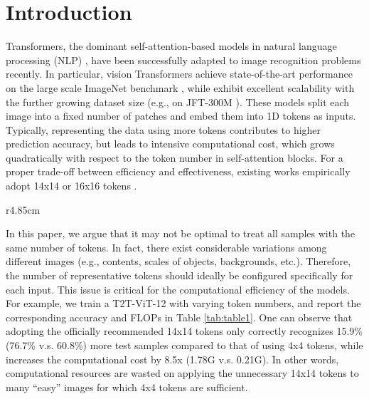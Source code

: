 \documentclass{article}
\begin{document}
\vspace{-1ex}
\section{Introduction}
\vspace{-1ex}
\label{sec:intro}

Transformers, the dominant self-attention-based models in natural language processing (NLP) \cite{devlin-etal-2019-bert, NIPS2017_3f5ee243, NEURIPS2020_1457c0d6}, have been successfully adapted to image recognition problems \cite{dosovitskiy2021an, yuan2021tokens, touvron2020training, han2021transformer} recently. In particular, vision Transformers achieve state-of-the-art performance on the large scale ImageNet benchmark \cite{5206848}, while exhibit excellent scalability with the further growing dataset size (e.g., on JFT-300M \cite{dosovitskiy2021an}). These models split each image into a fixed number of patches and embed them into 1D tokens as inputs. Typically, representing the data using more tokens contributes to higher prediction accuracy, but leads to intensive computational cost, which grows quadratically with respect to the token number in self-attention blocks. For a proper trade-off between efficiency and effectiveness, existing works empirically adopt 14x14 or 16x16 tokens \cite{dosovitskiy2021an, yuan2021tokens}.


\begin{wraptable}{r}{4.85cm}
    \centering
    \vskip -0.175in
    \caption{Accuracy and computational cost of T2T-ViT-12 with different token numbers on ImageNet.\label{tab:table1}} 
    \vskip -0.08in
    \vskip -0.2in
\end{wraptable}

In this paper, we argue that it may not be optimal to treat all samples with the same number of tokens. In fact, there exist considerable variations among different images (e.g., contents, scales of objects, backgrounds, etc.). Therefore, the number of representative tokens should ideally be configured specifically for each input. This issue is critical for the computational efficiency of the models. For example, we train a T2T-ViT-12 \cite{yuan2021tokens} with varying token numbers, and report the corresponding accuracy and FLOPs in Table \ref{tab:table1}. One can observe that adopting the officially recommended 14x14 tokens only correctly recognizes 15.9\% (76.7\% v.s. 60.8\%) more test samples compared to that of using 4x4 tokens, while increases the computational cost by 8.5x (1.78G v.s. 0.21G). In other words, computational resources are wasted on applying the unnecessary 14x14 tokens to many ``easy'' images for which 4x4 tokens are sufficient.
\end{document}
